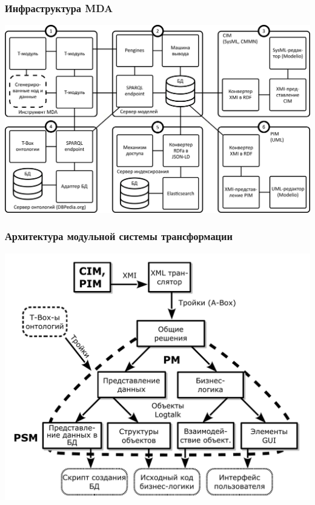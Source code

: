 \documentclass[10pt]{beamer}
\begin{document}
\begin{frame} \frametitle{Инфраструктура MDA} \centering

\includegraphics[width=1\linewidth]{architecture-mda-lod-ext-ru.png} \end{frame} \begin{frame} \frametitle{Архитектура модульной системы трансформации} \centering

\includegraphics[width=0.9\linewidth]{architect_tree_pres-ru-wo-OCL.pdf} \end{frame}
\end{document}
